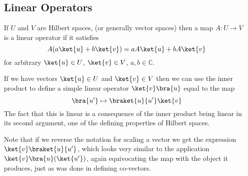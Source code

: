 \subsection{Linear Operators}
If $U$ and $V$ are Hilbert spaces, (or generally vector spaces) then a map $A: U \to V$ is a linear operator if it satisfies
\[A(a\ket{u} + b\ket{v}) = aA\ket{u} + bA\ket{v}\]
for arbitrary $\ket{u} \in U$, $\ket{v} \in V$, $a, b \in \mathbb{C}$.

If we have vectors $\ket{u} \in U$ and $\ket{v} \in V$ then we can use the inner product to define a simple linear operator $\ket{v}\bra{u}$ equal to the map
\[\bra{u'} \mapsto \braket{u}{u'}\ket{v}\]
The fact that this is linear is a consequence of the inner product being linear in its second argument, one of the defining properties of Hilbert spaces.

Note that if we reverse the notation for scaling a vector we get the expression $\ket{v}\braket{u}{u'}$, which looks very similar to the application $\ket{v}\bra{u}(\ket{u'})$, again equivocating the map with the object it produces, just as was done in defining co-vectors.

